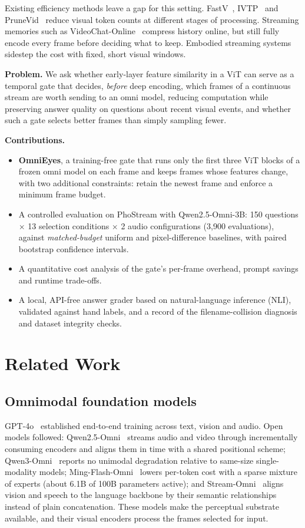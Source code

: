 \documentclass[conference]{IEEEtran}
\begin{document}
Existing efficiency methods leave a gap for this setting. FastV~\cite{chen2024fastv}, IVTP~\cite{huang2024ivtp} and PruneVid~\cite{huang2024prunevid} reduce visual token counts at different stages of processing. Streaming memories such as VideoChat-Online~\cite{huang2025ovbench} compress history online, but still fully encode every frame before deciding what to keep. Embodied streaming systems~\cite{wang2026ellsa,liu2025vitae} sidestep the cost with fixed, short visual windows.

\textbf{Problem.} We ask whether early-layer feature similarity in a ViT can serve as a temporal gate that decides, \emph{before} deep encoding, which frames of a continuous stream are worth sending to an omni model, reducing computation while preserving answer quality on questions about recent visual events, and whether such a gate selects better frames than simply sampling fewer.

\textbf{Contributions.}
\begin{itemize}
\item \textbf{OmniEyes}, a training-free gate that runs only the first three ViT blocks of a frozen omni model on each frame and keeps frames whose features change, with two additional constraints: retain the newest frame and enforce a minimum frame budget.
\item A controlled evaluation on PhoStream with Qwen2.5-Omni-3B: 150 questions $\times$ 13 selection conditions $\times$ 2 audio configurations (3{,}900 evaluations), against \emph{matched-budget} uniform and pixel-difference baselines, with paired bootstrap confidence intervals.
\item A quantitative cost analysis of the gate's per-frame overhead, prompt savings and runtime trade-offs.
\item A local, API-free answer grader based on natural-language inference (NLI), validated against hand labels, and a record of the filename-collision diagnosis and dataset integrity checks.
\end{itemize}

\section{Related Work}
\subsection{Omnimodal foundation models}
GPT-4o~\cite{openai2024gpt4o} established end-to-end training across text, vision and audio. Open models followed: Qwen2.5-Omni~\cite{xu2025qwen25omni} streams audio and video through incrementally consuming encoders and aligns them in time with a shared positional scheme; Qwen3-Omni~\cite{xu2025qwen3omni} reports no unimodal degradation relative to same-size single-modality models; Ming-Flash-Omni~\cite{inclusionai2025mingflash} lowers per-token cost with a sparse mixture of experts (about 6.1B of 100B parameters active); and Stream-Omni~\cite{zhang2025streamomni} aligns vision and speech to the language backbone by their semantic relationships instead of plain concatenation. These models make the perceptual substrate available, and their visual encoders process the frames selected for input.
\end{document}
